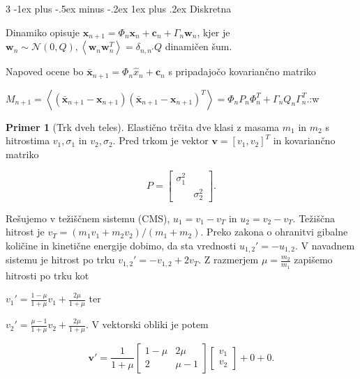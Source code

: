 \documentclass[10pt,landscape]{article}
\makeatletter
\renewcommand{\subsubsection}{\@startsection{subsubsection}{3}{0mm}%
	{-1ex plus -.5ex minus -.2ex}%
	{1ex plus .2ex}%
	{\normalfont\small\bfseries}}
\theoremstyle{definition}
\newtheorem*{primer}{Primer}
\makeatother
\begin{document}
\begin{multicols}{3}
\subsubsection{Diskretna}

Dinamiko opisuje \( \mathbf{x}_{n + 1} = \Phi_n \mathbf{x}_n + \mathbf{c}_n + \Gamma_n \mathbf{w}_n \), kjer je \( \mathbf{w}_n \sim \mathcal{N} \left( 0, Q \right), \left\langle \mathbf{w}_n \mathbf{w}_n^T \right\rangle = \delta_{n, n'} Q \) dinamičen šum.

Napoved ocene bo \( \bar{\mathbf{x}}_{n + 1} = \Phi_n \hat{x}_n + \mathbf{c}_n \) s pripadajočo kovariančno matriko

\( M_{n + 1} = \left\langle \left( \bar{\mathbf{x}}_{n + 1} - \mathbf{x}_{n + 1} \right) \left( \bar{\mathbf{x}}_{n + 1} - \mathbf{x}_{n + 1} \right)^T \right\rangle = \Phi_n P_n \Phi_n^T + \Gamma_n  Q_n \Gamma_n^T \).:w

\begin{primer}[Trk dveh teles]
  Elastično trčita dve klasi z masama \( m_1 \) in \( m_2 \)  s hitrostima \( v_1, \sigma_1 \) in \( v_2, \sigma_2 \). Pred trkom je vektor \( \mathbf{v} = [v_1, v_2]^T \) in kovariančno matriko

  \[ P = \begin{bmatrix}
         \sigma_{1} ^2 &  \\
          & \sigma_2 ^2
          \end{bmatrix}.
  \]

  Rešujemo v težiščnem sistemu (CMS), \( u_1 = v_1 - v_T \) in \( u_2 = v_2 - v_T \). Težiščna hitrost je \( v_T = \left( m_1 v_1 + m_2 v_2 \right) / (m_1 + m_2 ) \). Preko zakona o ohranitvi gibalne količine in kinetične energije dobimo, da sta vrednosti \( u_{1, 2} ' = - u_{1, 2} \). V navadnem sistemu je hitrost po trku \( v_{1, 2}' = - v_{1, 2} + 2 v_T \). Z razmerjem \( \mu= \frac{m_2}{m_1} \) zapišemo hitrosti po trku kot

  \( v_1 ' = \frac{1 - \mu}{1 + \mu} v_1 + \frac{2 \mu}{1 + \mu} \) ter

  \( v_2 ' = \frac{\mu - 1}{1 + \mu} v_2 + \frac{2 \mu}{1 + \mu} \). V vektorski obliki je potem

  \[ \mathbf{v}' = \frac{1}{1 + \mu} \begin{bmatrix}
                                     1 - \mu & 2 \mu \\
                                     2 & \mu - 1
                                      \end{bmatrix} \begin{bmatrix} v_{1} \\ v_{2} \end{bmatrix} + 0 + 0.
  \]


\end{primer}
\end{multicols}
\end{document}
